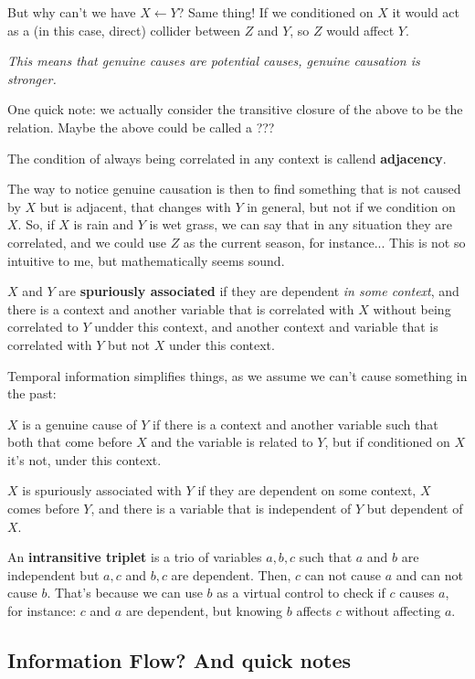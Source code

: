 But why can't we have $X \leftarrow Y$? Same thing! If we conditioned on $X$ it would act as a (in this case, direct) collider between $Z$ and $Y$, so $Z$ would affect $Y$.

\textit{This means that genuine causes are potential causes, genuine causation is stronger.}

One quick note: we actually consider the transitive closure of the above to be the  relation. Maybe the above could be called a ???

The condition of always being correlated in any context is callend \textbf{adjacency}.

The way to notice genuine causation is then to find something that is not caused by $X$ but is adjacent, that changes with $Y$ in general, but not if we condition on $X$. So, if $X$ is rain and $Y$ is wet grass, we can say that in any situation they are correlated, and we could use $Z$ as the current season, for instance... This is not so intuitive to me, but mathematically seems sound.

$X$ and $Y$ are \textbf{spuriously associated} if they are dependent \textit{in some context}, and there is a context and another variable that is correlated with $X$ without being correlated to $Y$ undder this context, and another context and variable that is correlated with $Y$ but not $X$ under this context.

Temporal information simplifies things, as we assume we can't cause something in the past:

$X$ is a genuine cause of $Y$ if there is a context and another variable such that both that come before $X$ and the variable is related to $Y$, but if conditioned on $X$ it's not, under this context.

$X$ is spuriously associated with $Y$ if they are dependent on some context, $X$ comes before $Y$, and there is a variable that is independent of $Y$ but dependent of $X$.

An \textbf{intransitive triplet} is a trio of variables $a,b,c$ such that $a$ and $b$ are independent but $a,c$ and $b,c$ are dependent. Then, $c$ can not cause $a$ and can not cause $b$. That's because we can use $b$ as a virtual control to check if $c$ causes $a$, for instance: $c$ and $a$ are dependent, but knowing $b$ affects $c$ without affecting $a$. 


\subsection{Information Flow? And quick notes}

